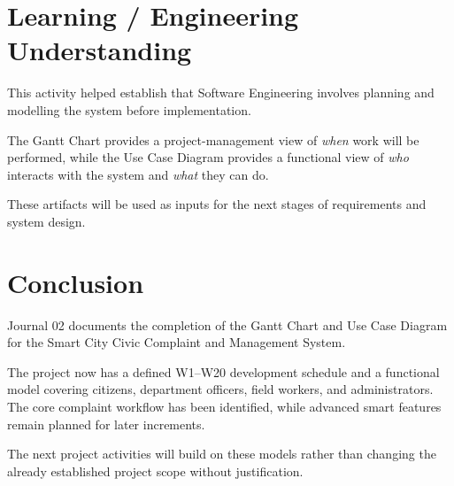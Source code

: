 \documentclass[12pt,a4paper]{article}
\begin{document}
\section{Learning / Engineering Understanding}

This activity helped establish that Software Engineering involves planning and modelling the system before implementation.

The Gantt Chart provides a project-management view of \emph{when} work will be performed, while the Use Case Diagram provides a functional view of \emph{who} interacts with the system and \emph{what} they can do.

These artifacts will be used as inputs for the next stages of requirements and system design.

\section{Conclusion}

Journal 02 documents the completion of the Gantt Chart and Use Case Diagram for the Smart City Civic Complaint and Management System.

The project now has a defined W1--W20 development schedule and a functional model covering citizens, department officers, field workers, and administrators. The core complaint workflow has been identified, while advanced smart features remain planned for later increments.

The next project activities will build on these models rather than changing the already established project scope without justification.
\end{document}
